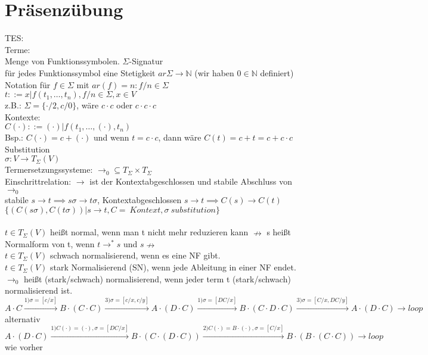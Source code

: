 \documentclass{article}
\newcommand{\nto}{\nrightarrow}
\begin{document}
	\section{Präsenzübung}
	TES:\\
	Terme:\\
	Menge von Funktionssymbolen. $\Sigma$-Signatur\\
	für jedes Funktionssymbol eine Stetigkeit $ar\Sigma\to \mathbb{N}$ (wir haben $0\in\mathbb{N}$ definiert)\\
	Notation für $f\in\Sigma$ mit $ar(f)=n: f/n\in\Sigma$\\
	$t::=x|f(t_1,\dots,t_n), f/n\in\Sigma, x\in V$\\
	z.B.: $\Sigma = \{\cdot/2,c/0\}$, wäre $c\cdot c$ oder $c\cdot c\cdot c$\\
	Kontexte:\\
	$C(\cdot)::= (\cdot)|f(t_1,\dots,(\cdot),t_n)$\\
	Bsp.: $C(\cdot) = c+(\cdot)$ und wenn $t=c\cdot c$, dann wäre $C(t)=c+t=c+c\cdot c$\\
	Substitution\\
	$\sigma:V\to T_{\Sigma}(V)$\\
	Termersetzungssysteme: $\to_0\subseteq T_\Sigma\times T_\Sigma$\\
	Einschrittrelation: $\to$ ist der Kontextabgeschlossen und stabile Abschluss von $\to_0$\\
	stabile $s\to t\implies s\sigma\to t\sigma$, Kontextabgeschlossen $s\to t\implies C(s)\to C(t)$\\
	$\{(C(s\sigma),C(t\sigma))|s\to t, C=\ Kontext, \sigma\ substitution\}$\\
	\\
	$t\in T_\Sigma(V)$ heißt normal, wenn man t nicht mehr reduzieren kann $\nto$
	s heißt Normalform von t, wenn $t\to^* s$ und $s\nto$\\
	$t\in T_\Sigma(V)$ schwach normalisierend, wenn es eine NF gibt.\\
	$t\in T_\Sigma(V)$ stark Normalisierend (SN), wenn jede Ableitung in einer NF endet.\\
	$\to_0$ heißt (stark/schwach) normalisierend, wenn jeder term t (stark/schwach) normalisierend ist.\\
	$A\cdot C\stackrel{1)\sigma = [c/x]}{\to} B\cdot(C\cdot C)\stackrel{3)\sigma = [c/x,c/y]}{\to} A\cdot (D \cdot C)\stackrel{1)\sigma = [DC/x]}{\to} B\cdot (C\cdot D\cdot C)\stackrel{3)\sigma = [C/x,DC/y]}{\to} A\cdot (D\cdot C)\to loop $\\
	alternativ $A\cdot (D\cdot C)\stackrel{1) C(\cdot) = (\cdot),\sigma=[DC/x]}{\to} B\cdot(C\cdot(D\cdot C))\stackrel{2)C(\cdot)=B\cdot (\cdot),\sigma = [C/x]}{\to} B\cdot (B\cdot (C\cdot C))\to  loop$ wie vorher\\
\end{document}
